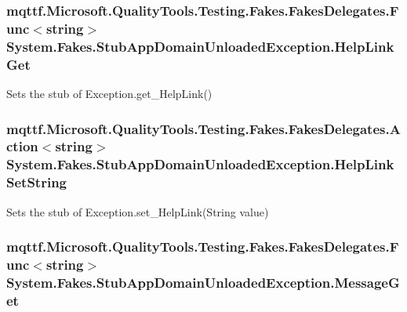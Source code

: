 \hypertarget{class_system_1_1_fakes_1_1_stub_app_domain_unloaded_exception_a0d6c0d709f360db5549c6af388b1bcba}{
\subsubsection[{Help\-Link\-Get}]{\setlength{\rightskip}{0pt plus 5cm}mqttf.\-Microsoft.\-Quality\-Tools.\-Testing.\-Fakes.\-Fakes\-Delegates.\-Func$<$string$>$ System.\-Fakes.\-Stub\-App\-Domain\-Unloaded\-Exception.\-Help\-Link\-Get}}\label{class_system_1_1_fakes_1_1_stub_app_domain_unloaded_exception_a0d6c0d709f360db5549c6af388b1bcba}


Sets the stub of Exception.\-get\-\_\-\-Help\-Link()

\hypertarget{class_system_1_1_fakes_1_1_stub_app_domain_unloaded_exception_a8a66c194c4ba4e2dfbb6e7f984144227}{
\subsubsection[{Help\-Link\-Set\-String}]{\setlength{\rightskip}{0pt plus 5cm}mqttf.\-Microsoft.\-Quality\-Tools.\-Testing.\-Fakes.\-Fakes\-Delegates.\-Action$<$string$>$ System.\-Fakes.\-Stub\-App\-Domain\-Unloaded\-Exception.\-Help\-Link\-Set\-String}}\label{class_system_1_1_fakes_1_1_stub_app_domain_unloaded_exception_a8a66c194c4ba4e2dfbb6e7f984144227}


Sets the stub of Exception.\-set\-\_\-\-Help\-Link(\-String value)

\hypertarget{class_system_1_1_fakes_1_1_stub_app_domain_unloaded_exception_acae195ecbd746943ce18a4f5f4634deb}{
\subsubsection[{Message\-Get}]{\setlength{\rightskip}{0pt plus 5cm}mqttf.\-Microsoft.\-Quality\-Tools.\-Testing.\-Fakes.\-Fakes\-Delegates.\-Func$<$string$>$ System.\-Fakes.\-Stub\-App\-Domain\-Unloaded\-Exception.\-Message\-Get}}\label{class_system_1_1_fakes_1_1_stub_app_domain_unloaded_exception_acae195ecbd746943ce18a4f5f4634deb}


